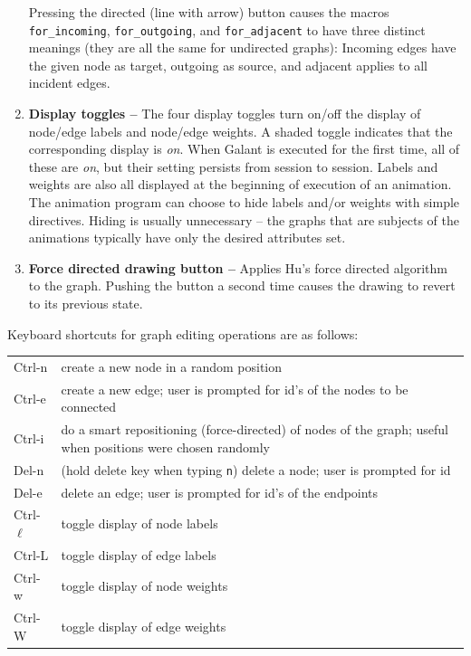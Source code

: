 \begin{enumerate}
Pressing the directed (line with arrow) button causes the macros
\texttt{for\_incoming}, \texttt{for\_outgoing}, and \texttt{for\_adjacent}
to have three distinct meanings (they are all the same for undirected graphs):
Incoming edges have the given node as target, outgoing as source, and adjacent applies to all incident edges.

\item
\textbf{Display toggles --}
The four display toggles turn on/off the display of node/edge labels and node/edge weights.
A shaded toggle indicates that the corresponding display is \emph{on}.
When Galant is executed for the first time, all of these are \emph{on},
but their setting persists from session to session.
Labels and weights are also all displayed at the beginning of execution of
an animation.
The animation program can choose to hide labels and/or weights with simple
directives.
Hiding is usually unnecessary -- the graphs that are subjects of the animations
typically have only the desired attributes set.

\item
\textbf{Force directed drawing button -- }
Applies Hu's force directed algorithm~\cite{2006-Mathematica-Hu} to the graph.
Pushing the button a second time causes the drawing to revert to its previous state.

\end{enumerate}

Keyboard shortcuts for graph editing operations are as follows:

\begin{tabular}{l @{ -- } p{}}
\textsf{Ctrl-n} & create a new node in a random position \\
\textsf{Ctrl-e} & create a new edge; user is prompted for id's of the nodes to
be connected \\
\textsf{Ctrl-i} & do a smart repositioning (force-directed)
of nodes of the graph;
useful when positions were chosen randomly \\
\textsf{Del-n} & (hold delete key when typing \texttt{n})
delete a node; user is prompted for id \\
\textsf{Del-e} & delete an edge; user is prompted for id's of the endpoints \\
\textsf{Ctrl-$\ell$} & toggle display of node labels \\
\textsf{Ctrl-L} & toggle display of edge labels \\
\textsf{Ctrl-w} & toggle display of node weights \\
\textsf{Ctrl-W} & toggle display of edge weights \\
\end{tabular}

